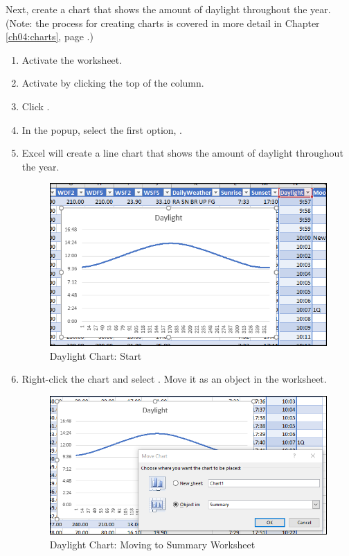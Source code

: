Next, create a chart that shows the amount of daylight throughout the year. (Note: the process for creating charts is covered in more detail in Chapter \ref{ch04:charts}, page \pageref{ch04:charts}.)

\begin{enumerate}
	\item Activate the  worksheet.
	\item Activate  by clicking the top of the column.
	\item Click .
	\item In the  popup, select the first option, .
	\item Excel will create a line chart that shows the amount of daylight throughout the year. 
	
	\begin{figure}[H]
		\centering
		\includegraphics[width=\maxwidth{.95\linewidth}]{gfx/ch09_fig88}
		\caption{Daylight Chart: Start}
		\label{09:fig88}
	\end{figure}
	
	\item Right-click the chart and select . Move it as an object in the  worksheet.

	\begin{figure}[H]
		\centering
		\includegraphics[width=\maxwidth{.95\linewidth}]{gfx/ch09_fig89}
		\caption{Daylight Chart: Moving to Summary Worksheet}
		\label{09:fig89}
	\end{figure}


\end{enumerate}

